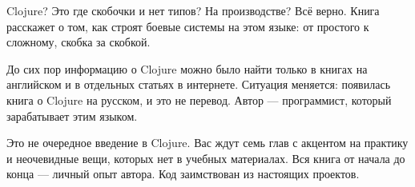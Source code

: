 
Clojure? Это где скобочки и нет типов? На производстве? Всё верно. Книга
расскажет о том, как строят боевые системы на этом языке: от простого к
сложному, скобка за скобкой.

До сих пор информацию о Clojure можно было найти только в книгах на английском и
в отдельных статьях в интернете. Ситуация меняется: появилась книга о Clojure на
русском, и это не перевод. Автор --- программист, который зарабатывает этим
языком.

Это не очередное введение в Clojure. Вас ждут семь глав с акцентом на практику и
неочевидные вещи, которых нет в учебных материалах. Вся книга от начала до
конца --- личный опыт автора. Код заимствован из настоящих проектов.
